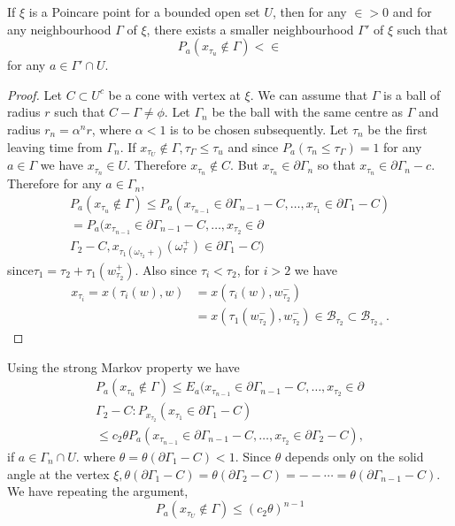 \begin{thm}\label{chap3-sec3-thm7}%
If $\xi$ is a Poincare point for a bounded open set $U$, then for
any $\in > 0$ and for any neighbourhood $\Gamma$ of $\xi$, there
exists a smaller neighbourhood $\Gamma'$ of $\xi$ such that 
$$
P_a (x_{\tau_u} \notin \Gamma) < \in
$$
for any $a \in \Gamma' \cap U$.
\end{thm}

\begin{proof}
Let $C \subset U^c$ be a cone with vertex at $\xi$. We can assume
  that $\Gamma$ is a ball of radius $r$ such that $C-\Gamma \neq
  \phi$. Let $\Gamma_n$ be the ball with the same centre as $\Gamma$
  and radius $r_n = \alpha^n r$, where $\alpha < 1$ is to be chosen
  subsequently. Let $\tau_n$ be the first leaving time from
  $\Gamma_n$. If $x_{\tau_U} \notin \Gamma, \tau_\Gamma \leq
  \tau_u$ and since $P_a(\tau_n \leq \tau_\Gamma) = 1$ for any $a \in
  \Gamma$ we have $x_{\tau_n} \in U$. Therefore $x_{\tau_n}\notin
  C$. But $x_{\tau_n} \in \partial \Gamma_n$ so that $x_{\tau_n} \in
  \partial \Gamma_n - c$. Therefore for any $a \in \Gamma_n$, 
  \begin{multline*}
    P_a (x_{\tau_u} \notin \Gamma) \leq P_a(x_{\tau_{n-1}} \in
    \partial \Gamma_{n-1} - C, \ldots, x_{\tau_1} \in \partial
    \Gamma_1 - C) \\ 
     = P_a (x_{\tau_{n-1}} \in \partial \Gamma_{n-1} - C, \ldots,
    x_{\tau_2} \in \partial\\ 
    \Gamma_2-C, x_{\tau_1 (\omega_{\tau_2}+)}
    (\omega_\tau^+) \in \partial \Gamma_1 - C) 
  \end{multline*}
  since\pageoriginale $\tau_1 = \tau_2 + \tau_1 (w^+_{\tau_2})$. Also
  since $\tau_i 
  < \tau_2$, for $i > 2$ we have  
  \begin{align*}
    x_{\tau_i} = x(\tau_i(w), w) & = x (\tau_i (w),w^-_{\tau_2}) \\
    & = x (\tau_1 (w^-_{\tau_2}), w^-_{\tau_2}) \in
    \mathscr{B}_{\tau_2} \subset \mathscr{B}_{\tau_{2+}}. 
  \end{align*}
\end{proof}

Using the strong Markov property we have
\begin{multline*}
  P_a (x_{\tau_u} \notin \Gamma) \leq  E_a (x_{\tau_{n-1}} \in
  \partial \Gamma_{n-1} -C, \ldots,x_{\tau_2} \in \partial\\ 
  \Gamma_2 -C : P_{x_{\tau_2}}(x_{\tau_1} \in \partial \Gamma_1 - C)\\ 
  \leq  c_2 \theta P_a (x_{\tau_{n-1}}\in \partial \Gamma_{n-1} - C,
  \ldots , x_{\tau_2} \in \partial \Gamma_2 - C), 
\end{multline*}
if $a \in \Gamma_n \cap U$. where $\theta = \theta (\partial \Gamma_1
-C)< 1$. Since $\theta$ depends only on the solid angle at the vertex
$\xi, \theta (\partial \Gamma_1 -C)=\theta  (\partial \Gamma_2 -C) =
-- \cdots = \theta(\partial \Gamma_{n-1}-C)$. We have repeating the
argument, 
$$
P_a (x_{\tau_U} \notin \Gamma) \leq (c_2 \theta)^{n-1}
$$

